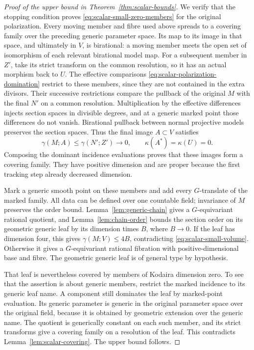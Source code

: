 \begin{proof}[Proof of the upper bound in Theorem~\ref{thm:scalar-bounds}]
We verify that the stopping condition proves
\eqref{eq:scalar-small-zero-members} for the original polarization.
Every moving member and fibre used above spreads to a covering
family over the preceding generic parameter space.  Its map to its
image in that space, and ultimately in $V$, is birational: a moving
member meets the open set of isomorphism of each relevant birational
model map.  For a subsequent member in $Z'$, take its strict transform
on the common resolution, so it has an actual morphism back to $U$.
The effective comparisons \eqref{eq:scalar-polarization-domination}
restrict to these members, since they are not contained in the extra
divisors.  Their successive restrictions compare the pullback of the
original $M$ with the final $N'$ on a common resolution.  Multiplication
by the effective differences injects section spaces in divisible
degrees, and at a generic marked point those differences do not
vanish.  Birational pullback between normal projective models preserves
the section spaces.  Thus the final image $A\subset V$ satisfies
\[
 \gamma(M;A)\le\gamma(N';Z')\longrightarrow0,
 \qquad \kappa(A^*)=\kappa(U)=0.
\]
Composing the dominant incidence evaluations proves that these images
form a covering family.  They have positive dimension and are proper
because the first tracking step already decreased dimension.

Mark a generic smooth point on these members and add every $G$-translate
of the marked family.  All data can be defined over one countable
field; invariance of $M$ preserves the order bound.
Lemma~\ref{lem:generic-chain} gives a $G$-equivariant rational quotient,
and Lemma~\ref{lem:chain-order} bounds the section order on its
geometric generic leaf by its dimension times $B$, where $B\to0$.
If the leaf has dimension four, this gives $\gamma(M;V)\le4B$, contradicting
\eqref{eq:scalar-small-volume}.  Otherwise it gives a $G$-equivariant
rational fibration with positive-dimensional base and fibre.  The
geometric generic leaf is of general type by hypothesis.

That leaf is nevertheless covered by members of Kodaira dimension
zero.  To see that the assertion is about generic members, restrict
the marked incidence to its generic leaf name.  A component still
dominates the leaf by marked-point evaluation.  Its generic parameter
is generic in the original parameter space over the original field,
because it is obtained by geometric extension over the generic name.
The quotient is generically constant on each such member, and its
strict transforms give a covering family on a resolution of the leaf.
This contradicts Lemma~\ref{lem:scalar-covering}.  The upper bound
follows.
\end{proof}

